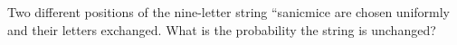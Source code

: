 Two different positions of the nine-letter string ``sanicmice are chosen uniformly and their letters exchanged. What is the probability the string is unchanged?
